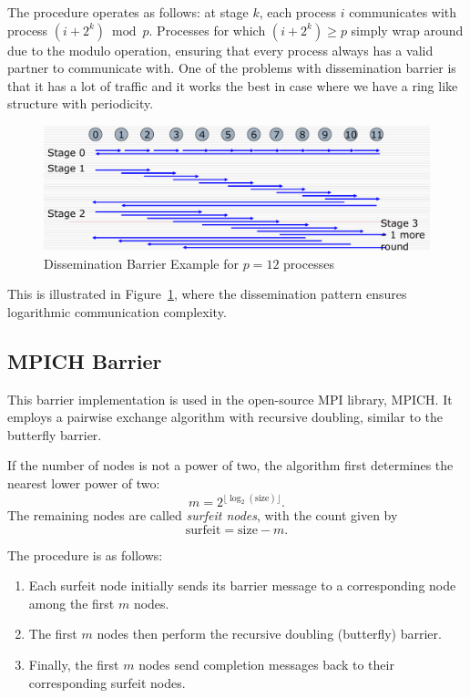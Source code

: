 \documentclass[12pt]{book}
\begin{document}
The procedure operates as follows: at stage $k$, each process $i$ communicates with process $(i+2^k) \bmod p$. Processes for which $(i+2^k) \geq p$ simply wrap around due to the modulo operation, ensuring that every process always has a valid partner to communicate with. One of the problems with dissemination barrier is that it has a lot of traffic and it works the best in case where we have a ring like structure with periodicity.
\begin{figure}[ht]
    \centering
    \includegraphics[width=0.75\linewidth]{images/dissemination.png}
    \caption{Dissemination Barrier Example for $p=12$ processes}
    \label{fig:dissemination}
\end{figure}
This is illustrated in Figure~\ref{fig:dissemination}, where the dissemination pattern ensures logarithmic communication complexity.

\subsection*{MPICH Barrier}
This barrier implementation is used in the open-source MPI library, MPICH. It employs a pairwise exchange algorithm with recursive doubling, similar to the butterfly barrier.

If the number of nodes is not a power of two, the algorithm first determines the nearest lower power of two:
\[
m = 2^{\lfloor \log_2(\text{size}) \rfloor}.
\]
The remaining nodes are called \emph{surfeit nodes}, with the count given by
\[
\text{surfeit} = \text{size} - m.
\]

The procedure is as follows:
\begin{enumerate}
    \item Each surfeit node initially sends its barrier message to a corresponding node among the first $m$ nodes.
    \item The first $m$ nodes then perform the recursive doubling (butterfly) barrier.
    \item Finally, the first $m$ nodes send completion messages back to their corresponding surfeit nodes.
\end{enumerate}
\end{document}
